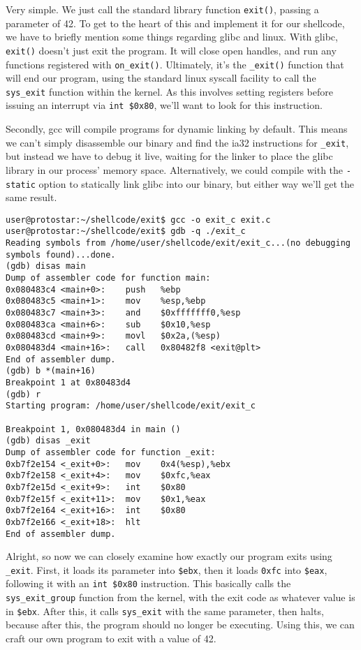 Very simple. We just call the standard library function \texttt{exit()}, passing a parameter of 42.
To get to the heart of this and implement it for our shellcode, we have to briefly mention
some things regarding glibc and linux. With glibc, \texttt{exit()} doesn't just exit the program.
It will close open handles, and run any functions registered with \texttt{on\_exit()}. Ultimately,
it's the \texttt{\_exit()} function that will end our program, using the standard linux syscall
facility to call the \texttt{sys\_exit} function within the kernel. As this involves setting
registers before issuing an interrupt via \texttt{int \$0x80}, we'll want to look for this instruction.

Secondly, gcc will compile programs for dynamic linking by default. This means we can't
simply disassemble our binary and find the ia32 instructions for \texttt{\_exit}, but
instead we have to debug it live, waiting for the linker to place the glibc library in
our process' memory space. Alternatively, we could compile with the \texttt{-static}
option to statically link glibc into our binary, but either way we'll get the same result.

\begin{lstlisting}
user@protostar:~/shellcode/exit$ gcc -o exit_c exit.c
user@protostar:~/shellcode/exit$ gdb -q ./exit_c
Reading symbols from /home/user/shellcode/exit/exit_c...(no debugging symbols found)...done.
(gdb) disas main
Dump of assembler code for function main:
0x080483c4 <main+0>:    push   %ebp
0x080483c5 <main+1>:    mov    %esp,%ebp
0x080483c7 <main+3>:    and    $0xfffffff0,%esp
0x080483ca <main+6>:    sub    $0x10,%esp
0x080483cd <main+9>:    movl   $0x2a,(%esp)
0x080483d4 <main+16>:   call   0x80482f8 <exit@plt>
End of assembler dump.
(gdb) b *(main+16)
Breakpoint 1 at 0x80483d4
(gdb) r
Starting program: /home/user/shellcode/exit/exit_c 

Breakpoint 1, 0x080483d4 in main ()
(gdb) disas _exit
Dump of assembler code for function _exit:
0xb7f2e154 <_exit+0>:   mov    0x4(%esp),%ebx
0xb7f2e158 <_exit+4>:   mov    $0xfc,%eax
0xb7f2e15d <_exit+9>:   int    $0x80
0xb7f2e15f <_exit+11>:  mov    $0x1,%eax
0xb7f2e164 <_exit+16>:  int    $0x80
0xb7f2e166 <_exit+18>:  hlt    
End of assembler dump.
\end{lstlisting}

Alright, so now we can closely examine how exactly our program exits using \texttt{\_exit}. First, it loads its
parameter into \texttt{\$ebx}, then it loads \texttt{0xfc} into \texttt{\$eax}, following it with an \texttt{int \$0x80}
instruction. This basically calls the \texttt{sys\_exit\_group} function from the kernel, with the exit
code as whatever value is in \texttt{\$ebx}. After this, it calls \texttt{sys\_exit} with the same parameter,
then halts, because after this, the program should no longer be executing. Using this, we can craft our
own program to exit with a value of 42.

